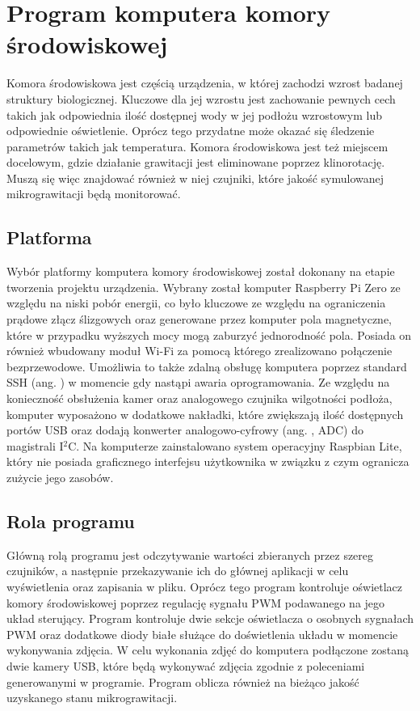 \graphicspath{{./Komora/images/}}

\chapter{Program komputera komory środowiskowej}

Komora środowiskowa jest częścią urządzenia, w której zachodzi wzrost badanej struktury biologicznej. Kluczowe dla jej wzrostu jest zachowanie pewnych cech takich jak odpowiednia ilość dostępnej wody w jej podłożu wzrostowym lub odpowiednie oświetlenie. Oprócz tego przydatne może okazać się śledzenie parametrów takich jak temperatura. Komora środowiskowa jest też miejscem docelowym, gdzie działanie grawitacji jest eliminowane poprzez klinorotację. Muszą się więc znajdować również w niej czujniki, które jakość symulowanej mikrograwitacji będą monitorować.

\section{Platforma}

Wybór platformy komputera komory środowiskowej został dokonany na etapie tworzenia projektu urządzenia. Wybrany został komputer Raspberry Pi Zero ze względu na niski pobór energii, co było kluczowe ze względu na ograniczenia prądowe złącz ślizgowych oraz generowane przez komputer pola magnetyczne, które w przypadku wyższych mocy mogą zaburzyć jednorodność pola. Posiada on również wbudowany moduł Wi-Fi za pomocą którego zrealizowano połączenie bezprzewodowe. Umożliwia to także zdalną obsługę komputera poprzez standard SSH (ang. ) w momencie gdy nastąpi awaria oprogramowania. Ze względu na konieczność obsłużenia kamer oraz analogowego czujnika wilgotności podłoża, komputer wyposażono w dodatkowe nakładki, które zwiększają ilość dostępnych portów USB oraz dodają konwerter analogowo-cyfrowy (ang. , ADC) do magistrali I$^2$C. Na komputerze zainstalowano system operacyjny Raspbian Lite, który nie posiada graficznego interfejsu użytkownika w związku z czym ogranicza zużycie jego zasobów.

\section{Rola programu}

Główną rolą programu jest odczytywanie wartości zbieranych przez szereg czujników, a następnie przekazywanie ich do głównej aplikacji w celu wyświetlenia oraz zapisania w pliku. Oprócz tego program kontroluje oświetlacz komory środowiskowej poprzez regulację sygnału PWM podawanego na jego układ sterujący. Program kontroluje dwie sekcje oświetlacza o osobnych sygnałach PWM oraz dodatkowe diody białe służące do doświetlenia układu w momencie wykonywania zdjęcia. W celu wykonania zdjęć do komputera podłączone zostaną dwie kamery USB, które będą wykonywać zdjęcia zgodnie z poleceniami generowanymi w programie. Program oblicza również na bieżąco jakość uzyskanego stanu mikrograwitacji.

